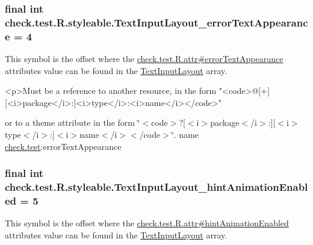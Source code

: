 \subsubsection[{Text\+Input\+Layout\+\_\+error\+Text\+Appearance}]{\setlength{\rightskip}{0pt plus 5cm}final int check.\+test.\+R.\+styleable.\+Text\+Input\+Layout\+\_\+error\+Text\+Appearance = 4\hspace{0.3cm}{\ttfamily [static]}}\label{classcheck_1_1test_1_1_r_1_1styleable_af1730eaed5795cdf53e63a5527d2d006}
This symbol is the offset where the \hyperlink{classcheck_1_1test_1_1_r_1_1attr_a8e9145212f04c891aeee85ee7abbd939}{check.\+test.\+R.\+attr\#error\+Text\+Appearance} attribute\textquotesingle{}s value can be found in the \hyperlink{classcheck_1_1test_1_1_r_1_1styleable_a56e445e43589d92521fa1b8fd6e2e470}{Text\+Input\+Layout} array.

\begin{DoxyVerb}      <p>Must be a reference to another resource, in the form "<code>@[+][<i>package</i>:]<i>type</i>:<i>name</i></code>"
\end{DoxyVerb}
 or to a theme attribute in the form \char`\"{}$<$code$>$?\mbox{[}$<$i$>$package$<$/i$>$\+:\mbox{]}\mbox{[}$<$i$>$type$<$/i$>$\+:\mbox{]}$<$i$>$name$<$/i$>$$<$/code$>$\char`\"{}.  name \hyperlink{namespacecheck_1_1test}{check.\+test}\+:error\+Text\+Appearance \hypertarget{classcheck_1_1test_1_1_r_1_1styleable_a8faed29d074a302a57bd6d80e27ad39a}{}
\subsubsection[{Text\+Input\+Layout\+\_\+hint\+Animation\+Enabled}]{\setlength{\rightskip}{0pt plus 5cm}final int check.\+test.\+R.\+styleable.\+Text\+Input\+Layout\+\_\+hint\+Animation\+Enabled = 5\hspace{0.3cm}{\ttfamily [static]}}\label{classcheck_1_1test_1_1_r_1_1styleable_a8faed29d074a302a57bd6d80e27ad39a}
This symbol is the offset where the \hyperlink{classcheck_1_1test_1_1_r_1_1attr_ac56c15568d0c8ec982363888f65d9c17}{check.\+test.\+R.\+attr\#hint\+Animation\+Enabled} attribute\textquotesingle{}s value can be found in the \hyperlink{classcheck_1_1test_1_1_r_1_1styleable_a56e445e43589d92521fa1b8fd6e2e470}{Text\+Input\+Layout} array.


